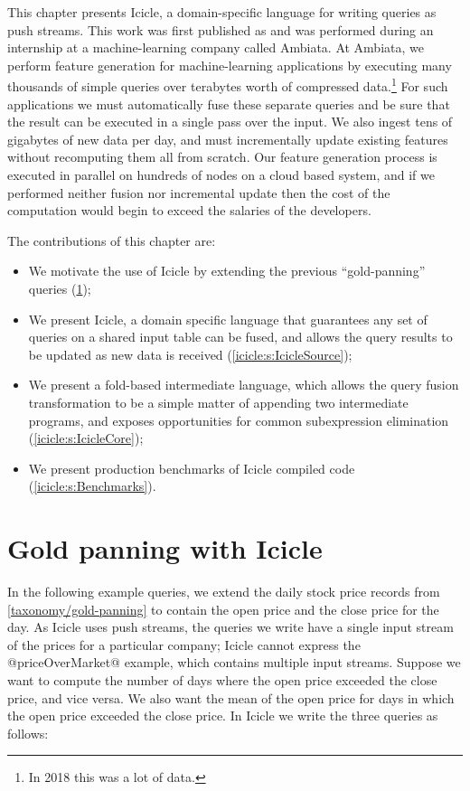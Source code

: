 \label{icicle:s:Introduction}

This chapter presents Icicle, a domain-specific language for writing queries as push streams.
This work was first published as \citep{robinson2016icicle} and was performed during an internship at a machine-learning company called Ambiata.
At Ambiata, we perform feature generation for machine-learning applications by executing many thousands of simple queries over terabytes worth of compressed data.\footnote{In 2018 this was a lot of data.}
For such applications we must automatically fuse these separate queries and be sure that the result can be executed in a single pass over the input.
We also ingest tens of gigabytes of new data per day, and must incrementally update existing features without recomputing them all from scratch.
Our feature generation process is executed in parallel on hundreds of nodes on a cloud based system, and if we performed neither fusion nor incremental update then the cost of the computation would begin to exceed the salaries of the developers.

The contributions of this chapter are:
\begin{itemize}
\item
  We motivate the use of Icicle by extending the previous ``gold-panning'' queries (\cref{icicle/gold-panning});

\item
  We present Icicle, a domain specific language that guarantees any set of queries on a shared input table can be fused, and allows the query results to be updated as new data is received (\cref{icicle:s:IcicleSource});

\item
  We present a fold-based intermediate language, which allows the query fusion transformation to be a simple matter of appending two intermediate programs, and exposes opportunities for common subexpression elimination (\cref{icicle:s:IcicleCore});

\item
  We present production benchmarks of Icicle compiled code (\cref{icicle:s:Benchmarks}). 
\end{itemize}

\section{Gold panning with Icicle}
\label{icicle/gold-panning}

In the following example queries, we extend the daily stock price records from \cref{taxonomy/gold-panning} to contain the open price and the close price for the day.
As Icicle uses push streams, the queries we write have a single input stream of the prices for a particular company; Icicle cannot express the @priceOverMarket@ example, which contains multiple input streams.
Suppose we want to compute the number of days where the open price exceeded the close price, and vice versa.
We also want the mean of the open price for days in which the open price exceeded the close price.
In Icicle we write the three queries as follows:

